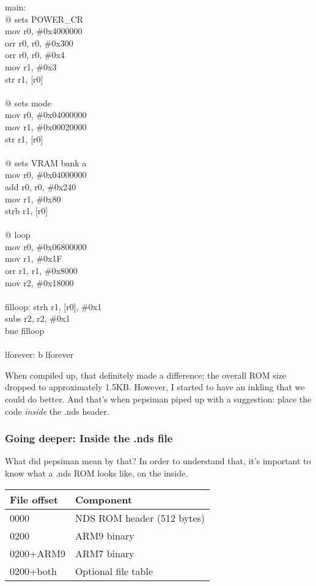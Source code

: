 \documentclass[11pt,a4paper]{article}
\begin{document}
main: 
\\@ sets POWER\_CR 
\\mov r0, \#0x4000000 
\\orr r0, r0, \#0x300 
\\orr r0, r0, \#0x4 
\\mov r1, \#0x3 
\\str r1, {[}r0{]} 
\\
\\@ sets mode 
\\mov r0, \#0x04000000 
\\mov r1, \#0x00020000 
\\str r1, {[}r0{]} 
\\
\\@ sets VRAM bank a
\\mov r0, \#0x04000000 
\\add r0, r0, \#0x240 
\\mov r1, \#0x80 
\\strb r1, {[}r0{]} 
\\
\\@ loop 
\\mov r0, \#0x06800000 
\\mov r1, \#0x1F 
\\orr r1, r1, \#0x8000
\\mov r2, \#0x18000 
\\
\\filloop: strh r1, {[}r0{]}, \#0x1 
\\subs r2, r2, \#0x1
\\bne filloop 
\\
\\lforever: b lforever

\newpage

When compiled up, that definitely made a difference; the overall ROM
size dropped to approximately 1.5KB. However, I started to have an
inkling that we could do better. And that's when pepsiman piped up with
a suggestion: place the code \emph{inside} the .nds header.

\subsubsection{Going deeper: Inside the .nds
file}\label{going-deeper-inside-the-.nds-file}

What did pepsiman mean by that? In order to understand that, it's
important to know what a .nds ROM looks like, on the inside.

\begin{longtable}[]{@{}ll@{}}
\toprule
File offset & Component\tabularnewline
\midrule
\endhead
0000 & NDS ROM header (512 bytes)\tabularnewline
0200 & ARM9 binary\tabularnewline
0200+ARM9 & ARM7 binary\tabularnewline
0200+both & Optional file table\tabularnewline
\bottomrule
\end{longtable}
\end{document}
